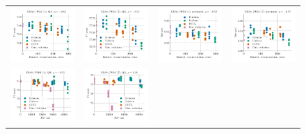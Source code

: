 \begin{figure}
	\centering
	\begin{tabular}{@{\hskip -0.0in}c@{\hskip -0.0in}c@{\hskip -0.0in}c@{\hskip -0.0in}c@{\hskip -0.0in}}
		\includegraphics[width=.245\linewidth]{figures/glove400k_qa_best-f1_vs_embed-frob-error_linx_stoc.pdf} &
		\includegraphics[width=.245\linewidth]{figures/glove-wiki400k-am_qa_best-f1_vs_embed-frob-error_linx_stoc.pdf} &
		\includegraphics[width=.245\linewidth]{figures/glove400k_sentiment_sst_test-acc_vs_embed-frob-error_linx_stoc.pdf} &
		\includegraphics[width=.245\linewidth]{figures/glove-wiki400k-am_sentiment_sst_test-acc_vs_embed-frob-error_linx_stoc.pdf} \\
		\includegraphics[width=.245\linewidth]{figures/glove400k_qa_best-f1_vs_gram-large-dim-frob-error_linx_stoc.pdf} &
		\includegraphics[width=.245\linewidth]{figures/glove-wiki400k-am_qa_best-f1_vs_gram-large-dim-frob-error_linx_stoc.pdf} &

\end{tabular}
\end{figure}
